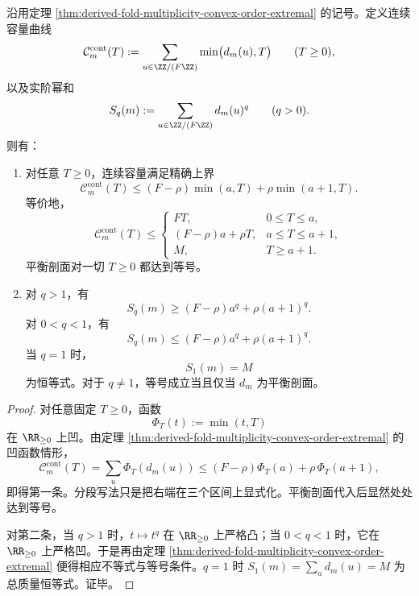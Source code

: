 \begin{theorem}[连续容量曲线与实阶幂和的精确包络]\label{thm:derived-fold-multiplicity-capacity-renyi-envelope}
沿用定理 \ref{thm:derived-fold-multiplicity-convex-order-extremal} 的记号。定义连续容量曲线
\[
\mathcal C_m^{\mathrm{cont}}(T):=\sum_{u\in \ZZ/(F\ZZ)}\min\bigl(d_m(u),T\bigr)
\qquad (T\ge 0),
\]
以及实阶幂和
\[
S_q(m):=\sum_{u\in \ZZ/(F\ZZ)} d_m(u)^q
\qquad (q>0).
\]
则有：
\begin{enumerate}
  \item 对任意 \(T\ge 0\)，连续容量满足精确上界
  \[
  \mathcal C_m^{\mathrm{cont}}(T)
  \le
  (F-\rho)\min(a,T)+\rho\min(a+1,T).
  \]
  等价地，
  \[
  \mathcal C_m^{\mathrm{cont}}(T)\le
  \begin{cases}
  FT, & 0\le T\le a,\\[4pt]
  (F-\rho)a+\rho T, & a\le T\le a+1,\\[4pt]
  M, & T\ge a+1.
  \end{cases}
  \]
  平衡剖面对一切 \(T\ge 0\) 都达到等号。

  \item 对 \(q>1\)，有
  \[
  S_q(m)\ge (F-\rho)a^q+\rho(a+1)^q.
  \]
  对 \(0<q<1\)，有
  \[
  S_q(m)\le (F-\rho)a^q+\rho(a+1)^q.
  \]
  当 \(q=1\) 时，
  \[
  S_1(m)=M
  \]
  为恒等式。对于 \(q\ne 1\)，等号成立当且仅当 \(d_m\) 为平衡剖面。
\end{enumerate}
\end{theorem}
\begin{proof}
对任意固定 \(T\ge 0\)，函数
\[
\Phi_T(t):=\min(t,T)
\]
在 \(\RR_{\ge 0}\) 上凹。由定理 \ref{thm:derived-fold-multiplicity-convex-order-extremal} 的凹函数情形，
\[
\mathcal C_m^{\mathrm{cont}}(T)
=
\sum_u \Phi_T(d_m(u))
\le
(F-\rho)\Phi_T(a)+\rho\,\Phi_T(a+1),
\]
即得第一条。分段写法只是把右端在三个区间上显式化。平衡剖面代入后显然处处达到等号。

对第二条，当 \(q>1\) 时，\(t\mapsto t^q\) 在 \(\RR_{\ge 0}\) 上严格凸；当 \(0<q<1\) 时，它在 \(\RR_{\ge 0}\) 上严格凹。于是再由定理 \ref{thm:derived-fold-multiplicity-convex-order-extremal} 便得相应不等式与等号条件。\(q=1\) 时 \(S_1(m)=\sum_u d_m(u)=M\) 为总质量恒等式。证毕。
\end{proof}

